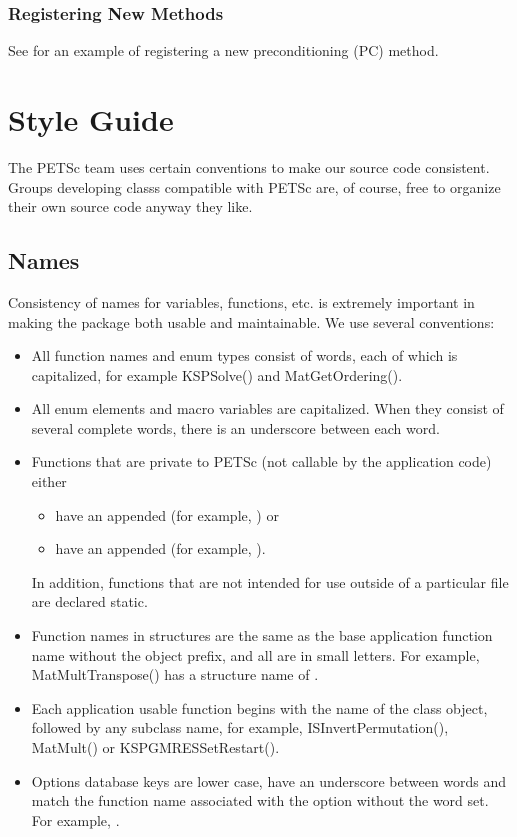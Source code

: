 \documentclass[twoside,12pt]{../sty/report_petsc}
\begin{document}
\subsection{Registering New Methods}
\label{sec:registeringnewmethods}

See  for an example of registering a new
preconditioning (PC) method.


\chapter{Style Guide}

The PETSc team uses certain conventions to make our source code consistent. Groups
developing classs compatible with PETSc are, of course, free to organize their
own source code anyway they like.

\section{Names}
Consistency of names for variables, functions, etc. is extremely 
important in making the package both usable and maintainable.
We use several conventions:
\begin{itemize}
\item All function names and enum types consist of words, each of 
      which is capitalized, for example KSPSolve() and 
      MatGetOrdering().
\item All enum elements and macro variables are capitalized. When
      they consist of several complete words, there is an underscore between each word.
\item Functions that are private to PETSc (not callable by the 
      application code) either
      \begin{itemize}
        \item have an appended  (for example, 
           ) or
        \item have an appended  (for example,
           ).
      \end{itemize}

      In addition, functions that are not intended for use outside
      of a particular file are declared static.
\item Function names in structures are the same as the base application
      function name without the object prefix, and all are in small letters. 
      For example, MatMultTranspose() has a structure name of 
      .
\item Each application usable function begins with the name of the class object, followed by any subclass name,
      for example, ISInvertPermutation(), MatMult() or KSPGMRESSetRestart(). 
\item Options database keys are lower case, have an underscore between words and match the function name associated with the option without the word set. For example, .
\end{itemize}
\end{document}
